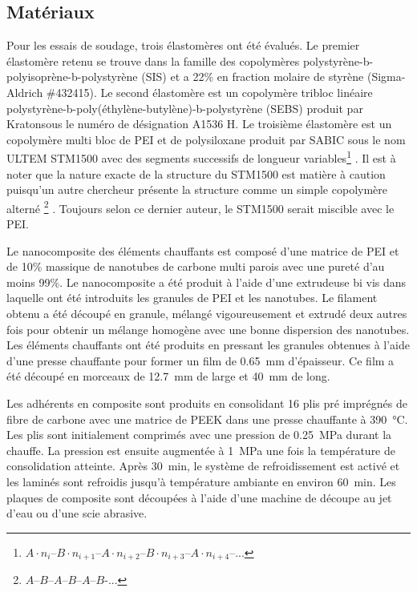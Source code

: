 \subsection{Matériaux}

Pour les essais de soudage, trois élastomères ont été évalués. 
Le premier élastomère retenu se trouve dans la famille des copolymères polystyrène-b-polyisoprène-b-polystyrène (SIS) et a 22\% en fraction molaire de styrène (Sigma-Aldrich \#432415). 
Le second élastomère est un copolymère tribloc linéaire polystyrène-b-poly(éthylène-butylène)-b-polystyrène (SEBS) produit par Kraton\textregistered sous le numéro de désignation A1536 H. 
Le troisième élastomère est un copolymère multi bloc de PEI et de polysiloxane produit par SABIC sous le nom ULTEM STM1500 avec des segments successifs de longueur variables\footnote{$A\cdot n_{i}$--$B\cdot n_{i+1}$--$A\cdot n_{i+2}$--$B\cdot n_{i+3}$--$A\cdot n_{i+4}$--...} \cite{mark2013,Holden2002}. 
Il est à noter que la nature exacte de la structure du STM1500 est matière à caution puisqu'un autre chercheur présente la structure comme un simple copolymère alterné \footnote{$A$--$B$--$A$--$B$--$A$--$B$-...} \cite{Hatui2015}. 
Toujours selon ce dernier auteur, le STM1500 serait miscible avec le PEI. 

Le nanocomposite des éléments chauffants est composé d'une matrice de PEI et de 10\% massique de nanotubes de carbone multi parois avec une pureté d'au moins 99\%. 
Le nanocomposite a été produit à l'aide d'une extrudeuse bi vis dans laquelle ont été introduits les granules de PEI et les nanotubes. 
Le filament obtenu a été découpé en granule, mélangé vigoureusement et extrudé deux autres fois pour obtenir un mélange homogène avec une bonne dispersion des nanotubes. 
Les éléments chauffants ont été produits en pressant les granules obtenues à l'aide d'une presse chauffante pour former un film de \SI{0,65}{\milli\metre} d'épaisseur. 
Ce film a été découpé en morceaux de \SI{12,7}{\milli\metre} de large et \SI{40}{\milli\metre} de long. 

Les adhérents en composite sont produits en consolidant 16 plis pré imprégnés de fibre de carbone avec une matrice de PEEK dans une presse chauffante à \SI{390}{\celsius}.
Les plis sont initialement comprimés avec une pression de \SI{0,25}{\mega\pascal} durant la chauffe.
La pression est ensuite augmentée à \SI{1}{\mega\pascal} une fois la température de consolidation atteinte. 
Après \SI{30}{\minute}, le système de refroidissement est activé et les laminés sont refroidis jusqu'à température ambiante en environ \SI{60}{\minute}. 
Les plaques de composite sont découpées à l'aide d'une machine de découpe au jet d'eau ou d'une scie abrasive. 

